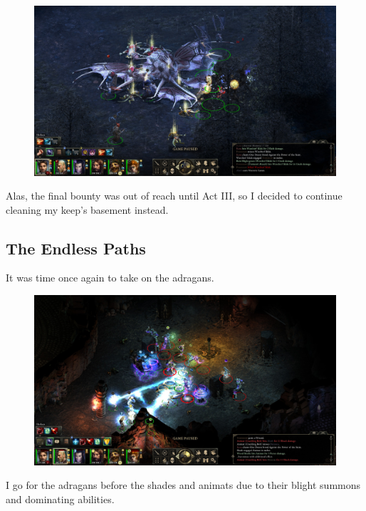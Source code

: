 \documentclass{article}
\begin{document}
\begin{figure}
\includegraphics[scale=0.33]{files/blog/2018_11_25_pillars_of_eternity_path_of_the_damned_act_ii/2018_11_25_warchiefiklak_end.jpg}
\end{figure}

Alas, the final bounty was out of reach until Act III, so I decided to continue cleaning my keep's basement instead.

\subsection{The Endless Paths}
It was time once again to take on the adragans.

\begin{figure}
\includegraphics[scale=0.33]{files/blog/2018_11_25_pillars_of_eternity_path_of_the_damned_act_ii/2018_11_25_adragan1.jpg}
\end{figure}

I go for the adragans before the shades and animats due to their blight summons and dominating abilities.
\end{document}
